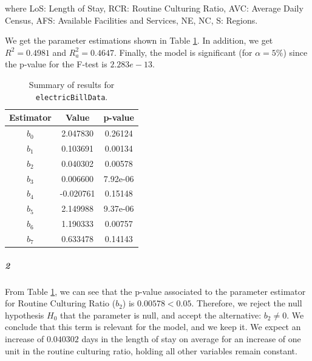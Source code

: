 \documentclass[]{article}
\let\oldsubparagraph\subparagraph
\renewcommand{\subparagraph}[1]{\oldsubparagraph{#1}\mbox{}}
\begin{document}
where LoS: Length of Stay, RCR: Routine Culturing Ratio, AVC: Average Daily Census, AFS: Available Facilities and Services, NE, NC, S: Regions.

We get the parameter estimations shown in Table \ref{q8}. In addition, we get $R^2 = 0.4981$ and $R^2_a = 0.4647$. Finally, the model is significant (for $\alpha = 5\%$) since the p-value for the F-test is $2.283e-13$.

\begin{table}[!ht]
\caption{Summary of results for \texttt{electricBillData}.}
\begin{center}
\begin{tabular}{|c|c|c|}
\hline
Estimator & Value & p-value \\
\hline
$b_0$ & 2.047830 & 0.26124 \\
$b_1$ & 0.103691 & 0.00134 \\
$b_2$ & 0.040302 & 0.00578 \\
$b_3$ & 0.006600 & 7.92e-06 \\
$b_4$ & -0.020761 & 0.15148 \\
$b_5$ & 2.149988 & 9.37e-06 \\
$b_6$ & 1.190333 & 0.00757 \\
$b_7$ & 0.633478 & 0.14143 \\
\hline
\end{tabular}
\end{center}
\label{q8}
\end{table}

\subparagraph{\Large 2}\normalsize

From Table \ref{q8}, we can see that the p-value associated to the parameter estimator for Routine Culturing Ratio ($b_2$) is $0.00578 < 0.05$. Therefore, we reject the null hypothesis $H_0$ that the parameter is null, and accept the alternative: $b_2 \neq 0$. We conclude that this term is relevant for the model, and we keep it. We expect an increase of $0.040302$ days in the length of stay on average for an increase of one unit in the routine culturing ratio, holding all other variables remain constant.
\end{document}
